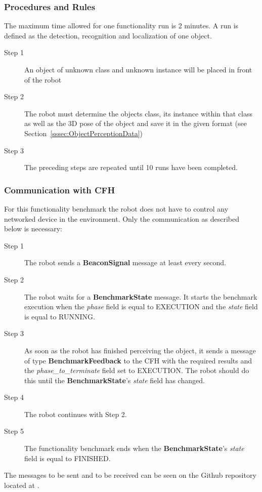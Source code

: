 \subsubsection{Procedures and Rules}
\label{sssec:ObjectPerceptionProcedures}

The maximum time allowed for one functionality run is 2 minutes. A run is defined as the detection, recognition and localization of one object.

\begin{description}
\item[Step 1] An object of unknown class and unknown instance will be placed in front of the robot
\item[Step 2] The robot must determine the objects class, its instance within that class as well as the 3D pose of the object and save it in the given format (see Section~\ref{sssec:ObjectPerceptionData})
\item[Step 3] The preceding steps are repeated until 10 runs have been completed.
\end{description}

\subsubsection{Communication with CFH}
\label{sssec:CommCFHObjectPerception}
For this functionality benchmark the robot does not have to control any networked device in the environment. Only the communication as described below is necessary:

\begin{description}
\item[Step 1] The robot sends a \textbf{BeaconSignal} message at least every second.
\item[Step 2] The robot waits for a \textbf{BenchmarkState} message. It starts the benchmark execution when the \emph{phase} field is equal to EXECUTION and the \emph{state} field is equal to RUNNING.
\item[Step 3] As soon as the robot has finished perceiving the object, it sends a message of type \textbf{BenchmarkFeedback} to the CFH with the required results and the \emph{phase\_to\_terminate} field set to EXECUTION. The robot should do this until the \textbf{BenchmarkState}'s \emph{state} field has changed.
\item[Step 4] The robot continues with Step 2.
\item[Step 5] The functionality benchmark ends when the \textbf{BenchmarkState}'s \emph{state} field is equal to FINISHED.
\end{description}
\noindent
The messages to be sent and to be received can be seen on the Github repository located at \cite{rockin:CFHMessages}.

